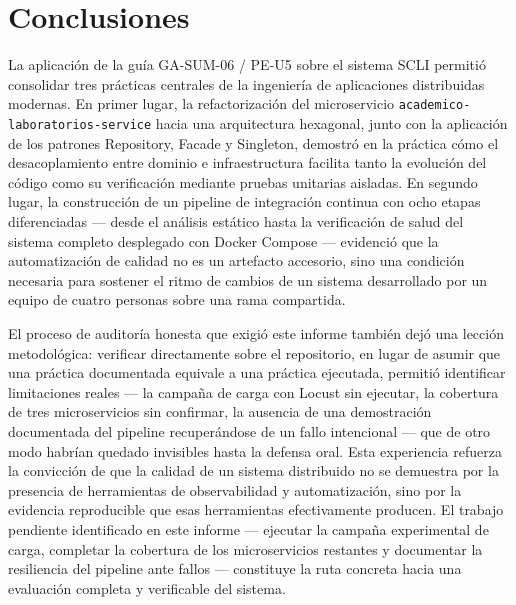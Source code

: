 \documentclass[11pt,a4paper]{article}
\begin{document}
\section{Conclusiones}
\label{sec:conclusiones}

La aplicación de la guía GA-SUM-06 / PE-U5 sobre el sistema SCLI
permitió consolidar tres prácticas centrales de la ingeniería de
aplicaciones distribuidas modernas. En primer lugar, la refactorización
del microservicio \texttt{academico-laboratorios-service} hacia una
arquitectura hexagonal, junto con la aplicación de los patrones
Repository, Facade y Singleton, demostró en la práctica cómo el
desacoplamiento entre dominio e infraestructura facilita tanto la
evolución del código como su verificación mediante pruebas unitarias
aisladas. En segundo lugar, la construcción de un pipeline de
integración continua con ocho etapas diferenciadas --- desde el
análisis estático hasta la verificación de salud del sistema completo
desplegado con Docker Compose --- evidenció que la automatización de
calidad no es un artefacto accesorio, sino una condición necesaria para
sostener el ritmo de cambios de un sistema desarrollado por un equipo
de cuatro personas sobre una rama compartida.

El proceso de auditoría honesta que exigió este informe también dejó
una lección metodológica: verificar directamente sobre el repositorio,
en lugar de asumir que una práctica documentada equivale a una práctica
ejecutada, permitió identificar limitaciones reales --- la campaña de
carga con Locust sin ejecutar, la cobertura de tres microservicios sin
confirmar, la ausencia de una demostración documentada del pipeline
recuperándose de un fallo intencional --- que de otro modo habrían
quedado invisibles hasta la defensa oral. Esta experiencia refuerza la
convicción de que la calidad de un sistema distribuido no se demuestra
por la presencia de herramientas de observabilidad y automatización,
sino por la evidencia reproducible que esas herramientas efectivamente
producen. El trabajo pendiente identificado en este informe --- ejecutar
la campaña experimental de carga, completar la cobertura de los
microservicios restantes y documentar la resiliencia del pipeline ante
fallos --- constituye la ruta concreta hacia una evaluación completa y
verificable del sistema.



\end{document}
